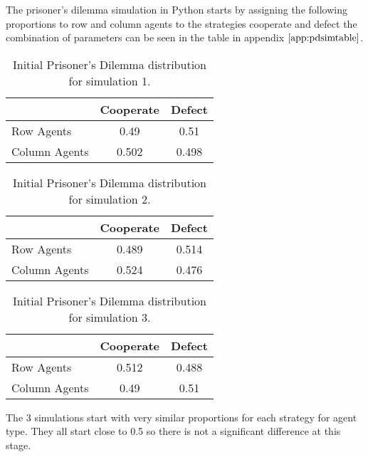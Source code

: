 \label{app:pdanalysisrounds}

The prisoner's dilemma simulation in Python starts by assigning the following proportions to row and column agents to the strategies cooperate and defect the combination of parameters can be seen in the table in appendix $\ref{app:pdsimtable}$.
\begin{table}[H]
\begin{center}
\begin{tabular}{|l|c|c|}
\hline
& Cooperate & Defect \\ 
\hline
Row Agents & 0.49 & 0.51\\

\hline
Column Agents & 0.502 & 0.498\\
\hline
\end{tabular}
\end{center}
\caption{ Initial Prisoner’s Dilemma distribution for simulation 1.}
\label{tab:pds1g1}
\end{table}

\begin{table}[H]
\begin{center}
\begin{tabular}{|l|c|c|}
\hline
& Cooperate & Defect \\ 
\hline
Row Agents & 0.489 & 0.514\\
\hline
Column Agents & 0.524 & 0.476\\
\hline
\end{tabular}
\end{center}
\caption{Initial Prisoner’s Dilemma distribution for simulation 2.}
\label{tab:pds2g1}
\end{table}

\begin{table}[H]
\begin{center}
\begin{tabular}{|l|c|c|}
\hline
& Cooperate & Defect \\ 
\hline
Row Agents & 0.512 & 0.488\\
\hline
Column Agents & 0.49 & 0.51\\
\hline
\end{tabular}
\end{center}
\caption{ Initial Prisoner’s Dilemma distribution for simulation 3.}
\label{tab:pds3g1}
\end{table}

 The 3 simulations start with very similar proportions for each strategy for agent type. They all start close to 0.5 so there is not a significant difference at this stage.

